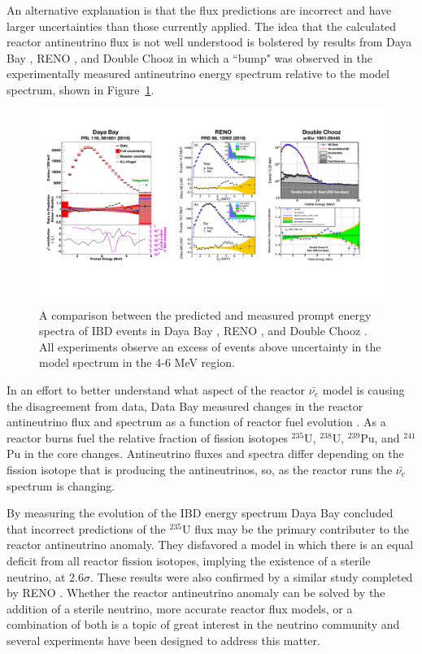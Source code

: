 An alternative explanation is that the flux predictions are incorrect and have larger uncertainties than those currently applied. 
The idea that the calculated reactor antineutrino flux is not well understood is bolstered by results from Daya Bay \cite{DayaBayAnomaly}, RENO \cite{Seo:2016uom}, and Double Chooz \cite{DoubleChooz:2019qbj} in which a ``bump" was observed in the experimentally measured antineutrino energy spectrum relative to the model spectrum, shown in Figure~\ref{fig:spectrums}.

\begin{figure}[t]
	\centering
	\includegraphics[width=1\linewidth]{tex/3-reactorneutrinos-images/Spectrums}
	\caption{A comparison between the predicted and measured prompt energy spectra of IBD events in Daya Bay \cite{DayaBayAnomaly}, RENO \cite{Seo:2016uom}, and Double Chooz \cite{DoubleChooz:2019qbj}. All experiments observe an excess of events above uncertainty in the model spectrum in the 4-6 MeV region.}
	\label{fig:spectrums}
\end{figure}

In an effort to better understand what aspect of the reactor $\bar{\nu_{e}}$ model is causing the disagreement from data, Data Bay measured changes in the reactor antineutrino flux and spectrum as a function of reactor fuel evolution \cite{An:2017osx, PhysRevLett.123.111801}.
As a reactor burns fuel the relative fraction of fission isotopes $^{235}$U, $^{238}$U, $^{239}$Pu, and $^{241}$Pu in the core changes.
Antineutrino fluxes and spectra differ depending on the fission isotope that is producing the antineutrinos, so, as the reactor runs the $\bar{\nu_{e}}$ spectrum is changing. 

By measuring the evolution of the IBD energy spectrum Daya Bay concluded that incorrect predictions of the $^{235}$U flux may be the primary contributer to the reactor antineutrino anomaly. 
They disfavored a model in which there is an equal deficit from all reactor fission isotopes, implying the existence of a sterile neutrino, at 2.6$\sigma$.
These results were also confirmed by a similar study completed by RENO \cite{PhysRevLett.122.232501}.
Whether the reactor antineutrino anomaly can be solved by the addition of a sterile neutrino, more accurate reactor flux models, or a combination of both is a topic of great interest in the neutrino community and several experiments have been designed to address this matter.
